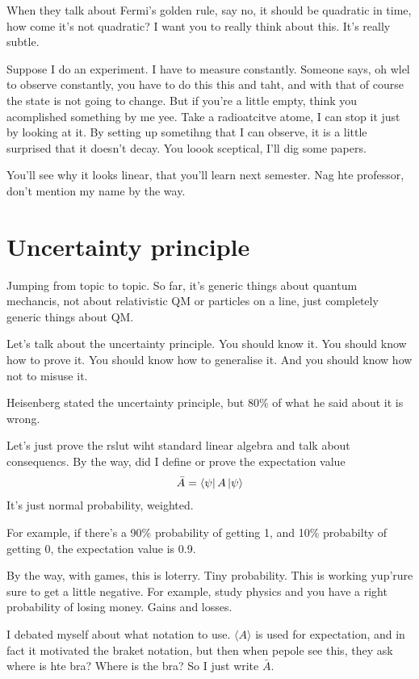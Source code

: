 When they talk about Fermi's golden rule,
say no,
it should be quadratic in time,
how come it's not quadratic?
I want you to really think about this.
It's really subtle.

Suppose I do an experiment.
I have to measure constantly.
Someone says,
oh wlel to observe constantly,
you have to do this this and taht,
and with that of course the state is not going to change.
But if you're a little empty,
think you acomplished something by me yee.
Take a radioatcitve atome,
I can stop it just by looking at it.
By setting up sometihng that I can observe,
it is a little surprised that it doesn't decay.
You loook sceptical,
I'll dig some papers.

You'll see why it looks linear,
that you'll learn next semester.
Nag hte professor, don't mention my name by the way.

\section{Uncertainty principle}
Jumping from topic to topic.
So far,
it's generic things about quantum mechancis,
not about relativistic QM or particles on a line,
just completely generic things about QM.

Let's talk about the uncertainty principle.
You should know it.
You should know how to prove it.
You should know how to generalise it.
And you should know how not to misuse it.

Heisenberg stated the uncertainty principle,
but 80\% of what he said about it is wrong.

Let's just prove the rslut wiht standard linear algebra and talk about
consequencs.
By the way,
did I define or prove the expectation value
\begin{align}
    \bar{A} = \bra{\psi} A\ket{\psi}
\end{align}
It's just normal probability,
weighted.

For example, if there's a 90\% probability of getting 1,
and 10\% probabilty of getting 0,
the expectation value is 0.9.

By the way, with games,
this is loterry.
Tiny probability.
This is working yup'rure sure to get a little negative.
For example,
study physics and you have a right probability of losing money.
Gains and losses.

I debated myself about what notation to use.
$\langle A\rangle$ is used for expectation,
and in fact it motivated the braket notation,
but then when pepole see this,
they ask where is hte bra?
Where is the bra?
So I just write $\bar{A}$.

